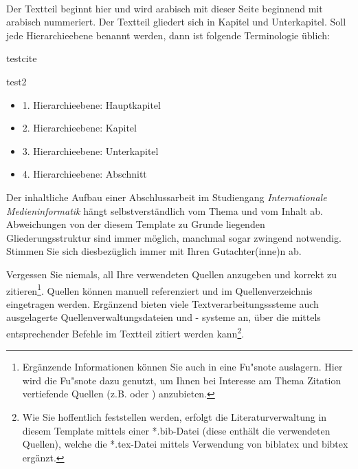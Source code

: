 \\
\linebreak[4]
\linebreak[4]
Der Textteil beginnt hier und wird arabisch mit dieser Seite beginnend mit \flqq{} arabisch nummeriert. Der Textteil gliedert sich in Kapitel und Unterkapitel. Soll jede Hierarchieebene benannt werden, dann ist folgende Terminologie  \"ublich:

testcite \cite{liuMarsCodeAgentAInative2024}

test2 \cite{tufanoEmpiricalStudyLearning2019}

\begin{itemize}
    \item 1. Hierarchieebene: Hauptkapitel
    \item 2. Hierarchieebene: Kapitel
    \item 3. Hierarchieebene: Unterkapitel
    \item 4. Hierarchieebene: Abschnitt
\end{itemize}

Der inhaltliche Aufbau einer Abschlussarbeit im Studiengang
\textit{Internationale Medieninformatik} h\"angt selbstverst\"andlich vom Thema und vom Inhalt ab. Abweichungen von der diesem Template zu Grunde liegenden Gliederungsstruktur sind immer m\"oglich, manchmal sogar zwingend notwendig. Stimmen Sie sich diesbez\"uglich immer mit Ihren Gutachter(inne)n ab.


Vergessen Sie niemals, all Ihre verwendeten Quellen anzugeben und korrekt zu zitieren\footnote{Erg\"anzende Informationen k\"onnen Sie auch in eine Fu"snote auslagern. Hier wird die Fu"snote dazu genutzt, um Ihnen bei Interesse am Thema Zitation vertiefende Quellen (z.B. \autocite{balzert2011} oder \autocite{franck2013}) anzubieten.}. Quellen k\"onnen manuell referenziert und im Quellenverzeichnis eingetragen werden. Erg\"anzend bieten viele Textverarbeitungsssteme auch ausgelagerte Quellenverwaltungsdateien und - systeme an,  \"uber die mittels entsprechender Befehle im Textteil zitiert werden kann\footnote{Wie Sie hoffentlich feststellen werden, erfolgt die Literaturverwaltung in diesem Template mittels einer *.bib-Datei (diese enth\"alt die verwendeten Quellen), welche die *.tex-Datei mittels Verwendung von biblatex und bibtex erg\"anzt.}.

